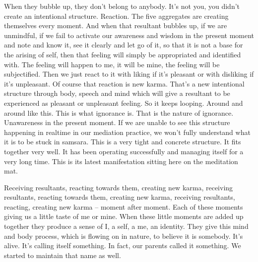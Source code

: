 \documentclass[letterpaper,10pt,english]{sphinxmanual}
\begin{document}
\sphinxAtStartPar
When they bubble up, they don’t belong to anybody. It’s not you, you
didn’t create an intentional structure.
Reaction. The five aggregates are creating
themselves  every  moment. And  when  that  resultant  bubbles  up,  if  we  are
unmindful, if we fail to activate our awareness and wisdom in the present
moment and note and know it, see it clearly and let go of it, so that it is not
a base for the arising of self, then that feeling will simply be appropriated
and identified with. The feeling will happen to me, it will be mine, the feeling will be subjectified. Then we just react to it with liking if it’s pleasant or
with disliking if it’s unpleasant. Of course that reaction is new karma. That’s
a new intentional structure through body, speech and mind which will give
a resultant to be experienced as pleasant or unpleasant feeling. So it keeps
looping. Around and around like this. This is what ignorance is. That is the
nature of ignorance. Unawareness in the present moment. If we are unable to
see this structure happening in real\sphinxhyphen{}time in our mediation practice, we won’t
fully understand what it is to be stuck in samsara. This is a very tight and
concrete structure. It fits together very well. It has been operating successfully and managing itself for a very long time. This is its latest manifestation
sitting here on the meditation mat.

\sphinxAtStartPar
Receiving  resultants,  reacting  towards  them,  creating  new  karma,
receiving  resultants,  reacting  towards  them,  creating  new  karma,  receiving resultants, reacting, creating new karma – moment after moment. Each
of  these  moments  giving  us  a  little  taste  of  me  or  mine. When  these  little
moments are added up together they produce a sense of I, a self, a me, an
identity. They give this mind and body process, which is flowing on in nature,
  to believe it is somebody. It’s alive. It’s calling itself something. In fact, our
parents called it something. We started to maintain that name as well.
\end{document}
